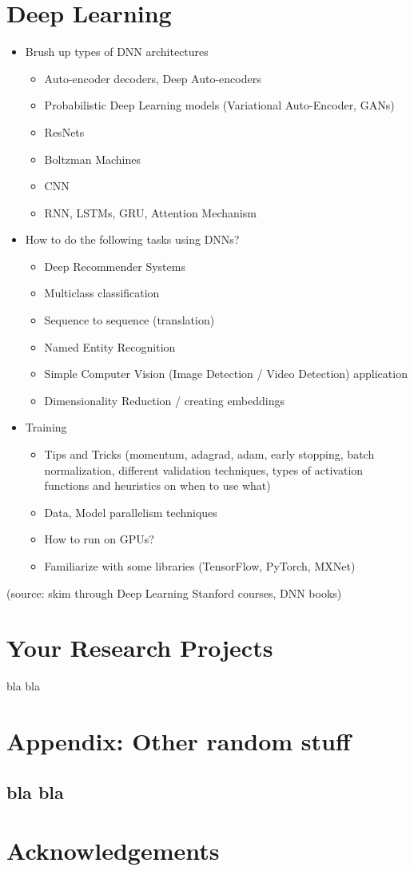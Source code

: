 \documentclass[english, 11pt]{article}
\begin{document}
\section{Deep Learning}
\begin{itemize}
\item Brush up types of DNN architectures
\begin{itemize}
\item Auto-encoder decoders, Deep Auto-encoders
\item Probabilistic Deep Learning models (Variational Auto-Encoder, GANs)
\item ResNets
\item Boltzman Machines
\item CNN
\item RNN, LSTMs, GRU, Attention Mechanism
\end{itemize}

\item How to do the following tasks using DNNs?
\begin{itemize}
\item Deep Recommender Systems
\item Multiclass classification
\item Sequence to sequence (translation)
\item Named Entity Recognition
\item Simple Computer Vision (Image Detection / Video Detection) application
\item Dimensionality Reduction / creating embeddings
\end{itemize}

\item Training
\begin{itemize}
\item Tips and Tricks (momentum, adagrad, adam, early stopping, batch normalization, different validation techniques, types of activation functions and heuristics on when to use what)
\item Data, Model parallelism techniques
\item How to run on GPUs?
\item Familiarize with some libraries (TensorFlow, PyTorch, MXNet)
\end{itemize}
\end{itemize}
(source: skim through Deep Learning Stanford courses, DNN books)

\section{Your Research Projects}
bla bla

\newpage

\section{Appendix: Other random stuff}
\subsection{bla bla}
\section{Acknowledgements}

  
\end{document}
